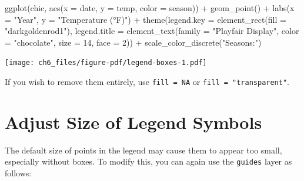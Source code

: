 \documentclass[
  letterpaper,
  DIV=11,
  numbers=noendperiod]{scrreprt}
\newenvironment{Shaded}{\begin{snugshade}}{\end{snugshade}}
\newcommand{\AttributeTok}[1]{\textcolor[rgb]{0.40,0.45,0.13}{#1}}
\newcommand{\DecValTok}[1]{\textcolor[rgb]{0.68,0.00,0.00}{#1}}
\newcommand{\FunctionTok}[1]{\textcolor[rgb]{0.28,0.35,0.67}{#1}}
\newcommand{\NormalTok}[1]{\textcolor[rgb]{0.00,0.23,0.31}{#1}}
\newcommand{\SpecialCharTok}[1]{\textcolor[rgb]{0.37,0.37,0.37}{#1}}
\newcommand{\StringTok}[1]{\textcolor[rgb]{0.13,0.47,0.30}{#1}}
\begin{document}
\begin{Shaded}
\begin{Highlighting}[]
\FunctionTok{ggplot}\NormalTok{(chic, }\FunctionTok{aes}\NormalTok{(}\AttributeTok{x =}\NormalTok{ date, }\AttributeTok{y =}\NormalTok{ temp, }\AttributeTok{color =}\NormalTok{ season)) }\SpecialCharTok{+}
  \FunctionTok{geom\_point}\NormalTok{() }\SpecialCharTok{+}
  \FunctionTok{labs}\NormalTok{(}\AttributeTok{x =} \StringTok{"Year"}\NormalTok{, }\AttributeTok{y =} \StringTok{"Temperature (°F)"}\NormalTok{) }\SpecialCharTok{+}
  \FunctionTok{theme}\NormalTok{(}\AttributeTok{legend.key =} \FunctionTok{element\_rect}\NormalTok{(}\AttributeTok{fill =} \StringTok{"darkgoldenrod1"}\NormalTok{),}
        \AttributeTok{legend.title =} \FunctionTok{element\_text}\NormalTok{(}\AttributeTok{family =} \StringTok{"Playfair Display"}\NormalTok{,}
                                    \AttributeTok{color =} \StringTok{"chocolate"}\NormalTok{,}
                                    \AttributeTok{size =} \DecValTok{14}\NormalTok{, }\AttributeTok{face =} \DecValTok{2}\NormalTok{)) }\SpecialCharTok{+}
  \FunctionTok{scale\_color\_discrete}\NormalTok{(}\StringTok{"Seasons:"}\NormalTok{)}
\end{Highlighting}
\end{Shaded}

\texttt{[image: ch6\_files/figure-pdf/legend-boxes-1.pdf]}

If you wish to remove them entirely, use \texttt{fill\ =\ NA} or
\texttt{fill\ =\ "transparent"}.

\section{Adjust Size of Legend
Symbols}\label{adjust-size-of-legend-symbols}

The default size of points in the legend may cause them to appear too
small, especially without boxes. To modify this, you can again use the
\texttt{guides} layer as follows:
\end{document}
